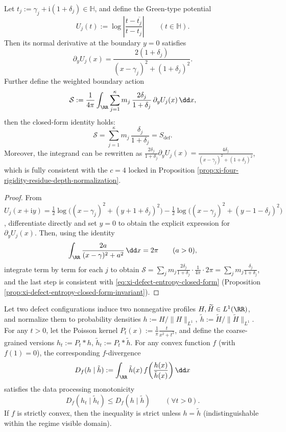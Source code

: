 \begin{proposition}\label{prop:xi-defect-entropy-green-neumann-boundary-action}
Let \(t_j:=\gamma_j+\mathrm{i}(1+\delta_j)\in\mathbb H\), and define the Green-type potential
\[
U_j(t):=\log\left|\frac{t-\overline{t_j}}{t-t_j}\right|
\qquad(t\in\mathbb H).
\]
Then its normal derivative at the boundary \(y=0\) satisfies
\[
\partial_y U_j(x)=\frac{2(1+\delta_j)}{(x-\gamma_j)^2+(1+\delta_j)^2}.
\]
Further define the weighted boundary action
\[
\mathcal S
:=\frac{1}{4\pi}\int_{\RR}\sum_{j=1}^{\kappa}m_j\,\frac{2\delta_j}{1+\delta_j}\,\partial_y U_j(x)\,\dd x,
\]
then the closed-form identity holds:
\[
\boxed{\;
\mathcal S=\sum_{j=1}^{\kappa}m_j\,\frac{\delta_j}{1+\delta_j}=S_{\mathrm{def}}.\;}
\]
Moreover, the integrand can be rewritten as
\(
\frac{2\delta_j}{1+\delta_j}\partial_y U_j(x)=\frac{4\delta_j}{(x-\gamma_j)^2+(1+\delta_j)^2}
\), which is fully consistent with the \(c=4\) locked in Proposition \ref{prop:xi-four-rigidity-residue-depth-normalization}.
\end{proposition}

\begin{proof}
From
\(
U_j(x+\mathrm{i}y)
=\frac12\log\!\bigl((x-\gamma_j)^2+(y+1+\delta_j)^2\bigr)
-\frac12\log\!\bigl((x-\gamma_j)^2+(y-1-\delta_j)^2\bigr)
\),
differentiate directly and set \(y=0\) to obtain the explicit expression for \(\partial_y U_j(x)\).
Then, using the identity
\[
\int_{\RR}\frac{2a}{(x-\gamma)^2+a^2}\,\dd x=2\pi\qquad(a>0),
\]
integrate term by term for each \(j\) to obtain
\(
\mathcal S=\sum_j m_j\frac{2\delta_j}{1+\delta_j}\cdot\frac{1}{4\pi}\cdot 2\pi
=\sum_j m_j\frac{\delta_j}{1+\delta_j}
\),
and the last step is consistent with \eqref{eq:xi-defect-entropy-closed-form} (Proposition \ref{prop:xi-defect-entropy-closed-form-invariant}). \qedhere
\end{proof}

\begin{proposition}\label{prop:xi-poisson-coarsegraining-f-divergence-contraction}
Let two defect configurations induce two nonnegative profiles \(H,\widetilde H\in L^1(\RR)\), and normalize them to probability densities
\(
h:=H/\|H\|_{L^1},\ \tilde h:=\widetilde H/\|\widetilde H\|_{L^1}.
\)
For any \(t>0\), let the Poisson kernel \(P_t(x):=\frac{1}{\pi}\frac{t}{x^2+t^2}\), and define the coarse-grained versions \(h_t:=P_t*h\), \(\tilde h_t:=P_t*\tilde h\).
For any convex function \(f\) (with \(f(1)=0\)), the corresponding \(f\)-divergence
\[
D_f(h\mid \tilde h):=\int_{\RR}\tilde h(x)\,f\!\left(\frac{h(x)}{\tilde h(x)}\right)\dd x
\]
satisfies the data processing monotonicity
\[
\boxed{\;
D_f(h_t\mid \tilde h_t)\le D_f(h\mid \tilde h)\qquad(\forall t>0).\;}
\]
If \(f\) is strictly convex, then the inequality is strict unless \(h=\tilde h\) (indistinguishable within the regime visible domain).
\end{proposition}

